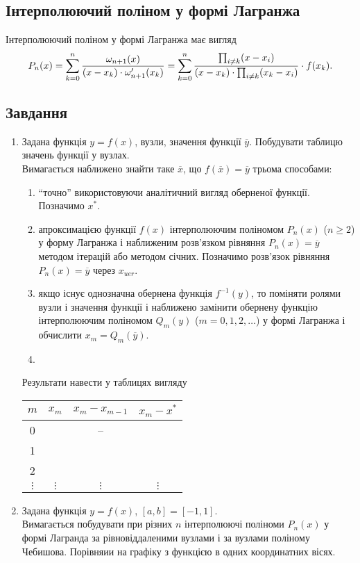 \subsection{Інтерполюючий поліном у формі Лагранжа}

Інтерполюючий поліном у формі Лагранжа має вигляд
\begin{equation}
	\label{eq:2.5}
	P_n(x) = \displaystyle\sum\limits_{k=0}^n \frac{\omega_{n+1}(x)}{(x - x_k) \cdot \omega_{n+1}'(x_k)} = \displaystyle\sum\limits_{k=0}^n \frac{\prod_{i\ne k}(x - x_i)}{(x - x_k) \cdot \prod_{i\ne k}(x_k - x_i)} \cdot f(x_k).
\end{equation}

\subsection{Завдання}

\begin{enumerate}
	\item Задана функція $y = f(x)$, вузли, значення функції $\overline{y}$. Побудувати таблицю значень функції у вузлах. \\

	Вимагається наближено знайти таке $\overline{x}$, що $f(\overline{x}) = \overline{y}$ трьома способами:
	\begin{enumerate}
		\item ``точно'' використовуючи аналітичний вигляд оберненої функції. Позначимо $x^*$.
		\item апроксимацією функції $f(x)$ інтерполюючим поліномом $P_n(x)$ ($n \ge 2$) у форму Лагранжа і наближеним розв'язком рівняння $P_n(x) = \overline{y}$  методом ітерацій або методом січних. Позначимо розв'язок рівняння $P_n(x) = \overline{y}$ через $x_{uer}$.
		\item якщо існує однозначна обернена функція $f^{-1}(y)$, то поміняти ролями вузли і значення функції і наближено замінити обернену функцію інтерполюючим поліномом $Q_m(y)$ ($m=0,1,2,\ldots$) у формі Лагранжа і обчислити $x_m = Q_m(\overline{y})$.
		\item 
	\end{enumerate}
	Результати навести у таблицях вигляду
	\begin{table}[H]
		\centering
		\begin{tabular}{|c|c|c|c|}
			\hline
			$m$ & $x_m$ & $x_m - x_{m-1}$ & $x_m - x^*$ \\ \hline
			0 & & -- & \\ \hline
			1 & & & \\ \hline
			2 & & & \\ \hline
			$\vdots$ & $\vdots$ & $\vdots$ & $\vdots$ \\ \hline
		\end{tabular}
	\end{table}
	\item Задана функція $y = f(x)$, $[a,b] = [-1,1]$. \\

	Вимагається побудувати при різних $n$ інтерполюючі поліноми $P_n(x)$ у формі Лагранда за рівновіддаленими вузлами і за вузлами поліному Чебишова. Порівняии на графіку з функцією в одних координатних вісях.
\end{enumerate}